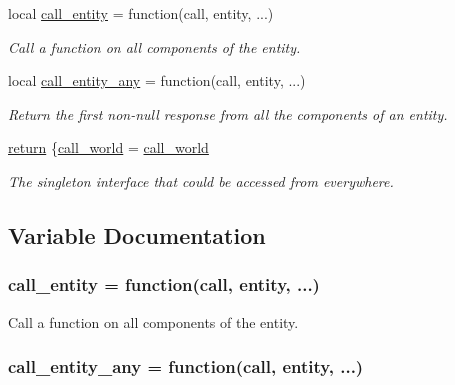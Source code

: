 \begin{DoxyCompactItemize}
local \hyperlink{controller_8lua_a19383453e5fbfe543e5b2283bc77f0cd}{call\-\_\-entity} = function(call, entity, ...)
\begin{DoxyCompactList}\small\item\em Call a function on all components of the entity. \end{DoxyCompactList}\item 
local \hyperlink{controller_8lua_a5f0a1c6512306c6d99f18d486492c0d4}{call\-\_\-entity\-\_\-any} = function(call, entity, ...)
\begin{DoxyCompactList}\small\item\em Return the first non-\/null response from all the components of an entity. \end{DoxyCompactList}\item 
\hyperlink{controller_8lua_a9717e7bbecb906637e86cef6da3d83c2}{return} \{\hyperlink{controller_8lua_a063db58d193e393e992dc02d752b6abb}{call\-\_\-world} = \hyperlink{controller_8lua_a063db58d193e393e992dc02d752b6abb}{call\-\_\-world}
\begin{DoxyCompactList}\small\item\em The singleton interface that could be accessed from everywhere. \end{DoxyCompactList}\end{DoxyCompactItemize}


\subsection{Variable Documentation}
\hypertarget{controller_8lua_a19383453e5fbfe543e5b2283bc77f0cd}{
\subsubsection[{call\-\_\-entity}]{\setlength{\rightskip}{0pt plus 5cm}call\-\_\-entity = function(call, entity, ...)}}\label{controller_8lua_a19383453e5fbfe543e5b2283bc77f0cd}


Call a function on all components of the entity. 

\hypertarget{controller_8lua_a5f0a1c6512306c6d99f18d486492c0d4}{
\subsubsection[{call\-\_\-entity\-\_\-any}]{\setlength{\rightskip}{0pt plus 5cm}call\-\_\-entity\-\_\-any = function(call, entity, ...)}}\label{controller_8lua_a5f0a1c6512306c6d99f18d486492c0d4}


